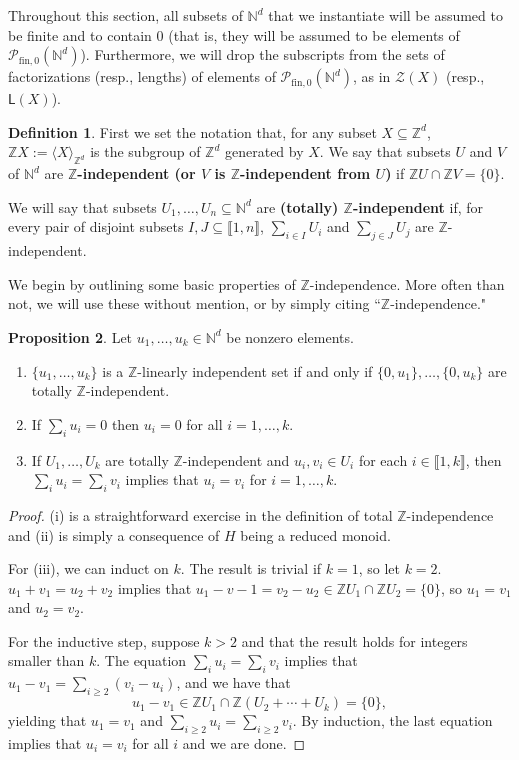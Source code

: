 \documentclass{report}
\newcommand{\NN}{\mathbb{N}}
\renewcommand{\P}{\mathcal{P}}
\newcommand{\ZZ}{\mathbb{Z}}
\newcommand{\Z}{\mathcal{Z}}
\newcommand{\gen}[1]{\langle #1 \rangle}
\newcommand{\llb}{\llbracket}
\newcommand{\rrb}{\rrbracket}
\newcommand{\fon}{{\textrm{fin}, 0}}
\renewcommand{\:}{\text{:}}
\theoremstyle{definition}
\newtheorem{defn}{Definition}[section]
\newtheorem{prop}[defn]{Proposition}
\begin{document}
Throughout this section, all subsets of $\NN^d$ that we instantiate will be assumed to be finite and to contain $0$ (that is, they will be assumed to be elements of $\P_\fon(\NN^d)$).
Furthermore, we will drop the subscripts from the sets of factorizations (resp., lengths) of elements of $\P_\fon(\NN^d)$, as in $\Z(X)$ (resp., $\mathsf{L}(X)$).

\begin{defn}
First we set the notation that, for any subset $X \subseteq \ZZ^d$, $\ZZ X := \gen{X}_{\ZZ^d}$ is the subgroup of $\ZZ^d$ generated by $X$.
We say that subsets $U$ and $V$ of $\NN^d$ are \textbf{$\ZZ$-independent (or $V$ is $\ZZ$-independent from $U$)} if $\ZZ U \cap \ZZ V = \{0\}$.

We will say that subsets $U_1,\dots, U_n\subseteq \NN^d$ are \textbf{(totally) $\ZZ$-independent} if, for every pair of disjoint subsets $I,J\subseteq\llb 1,n \rrb$, $\sum_{i\in I} U_i$ and $\sum_{j\in J} U_j$ are $\ZZ$-independent.
\end{defn}

We begin by outlining some basic properties of $\ZZ$-independence.  
More often than not, we will use these without mention, or by simply citing ``$\ZZ$-independence."
\begin{prop} \label{prop:eltwise-indep}
Let $u_1,\dots, u_k\in \NN^d$ be nonzero elements.
\begin{enumerate}[label={\rm (\roman{*})}]
	\item $\{u_1,\dots,u_k\}$ is a $\ZZ$-linearly independent set if and only if $\{0,u_1\},\dots,\{0,u_k\}$ are totally $\ZZ$-independent.
	
	\item If $\sum_i u_i = 0$ then $u_i = 0$ for all $i=1,\dots, k$.
	
	\item If $U_1,\dots, U_k$ are totally $\ZZ$-independent and $u_i, v_i\in U_i$ for each $i\in \llb 1,k \rrb$,
	then $\sum_i u_i = \sum_i v_i$ implies that $u_i = v_i$ for $i = 1,\dots, k$.
\end{enumerate}
\end{prop}

\begin{proof}
(i) is a straightforward exercise in the definition of total $\ZZ$-independence and (ii) is simply a consequence of $H$ being a reduced monoid.

For (iii), we can induct on $k$.
The result is trivial if $k = 1$, so let $k=2$.
$u_1 + v_1 = u_2 + v_2$ implies that $u_1 - v-1 = v_2 - u_2 \in \ZZ U_1 \cap \ZZ U_2 = \{0\}$, so $u_1 = v_1$ and $u_2 = v_2$.

For the inductive step, suppose $k>2$ and that the result holds for integers smaller than $k$.
The equation $\sum_i u_i = \sum_i v_i$ implies that $u_1 - v_1 = \sum_{i\ge 2} (v_i - u_i)$, and we have that 
\[u_1 - v_1 \in \ZZ U_1 \cap \ZZ(U_2+\cdots+U_k) = \{0\},\]
yielding that $u_1 = v_1$ and $\sum_{i\ge 2} u_i = \sum_{i\ge 2} v_i$.
By induction, the last equation implies that $u_i = v_i$ for all $i$ and we are done.
\end{proof}
\end{document}
